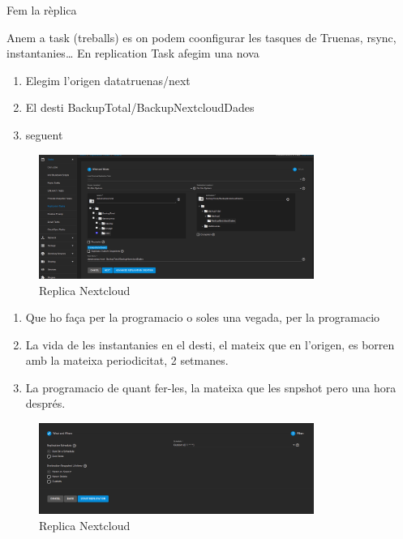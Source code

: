 \documentclass[
  10pt,
]{krantz}
\providecommand{\tightlist}{%
  \setlength{\itemsep}{0pt}\setlength{\parskip}{0pt}}
\begin{document}
Fem la rèplica

Anem a task (treballs) es on podem coonfigurar les tasques de Truenas, rsync, instantanies\ldots{} En replication Task afegim una nova

\begin{enumerate}
\def\labelenumi{\arabic{enumi}.}
\tightlist
\item
  Elegim l'origen datatruenas/next
\item
  El desti BackupTotal/BackupNextcloudDades
\item
  seguent
\end{enumerate}

\begin{figure}
\centering
\includegraphics[width=0.8\textwidth,height=\textheight]{imatges/proxmox/replica1.png}
\caption{Replica Nextcloud}
\end{figure}

\begin{enumerate}
\def\labelenumi{\arabic{enumi}.}
\tightlist
\item
  Que ho faça per la programacio o soles una vegada, per la programacio
\item
  La vida de les instantanies en el desti, el mateix que en l'origen, es borren amb la mateixa periodicitat, 2 setmanes.
\item
  La programacio de quant fer-les, la mateixa que les snpshot pero una hora després.
\end{enumerate}

\begin{figure}
\centering
\includegraphics[width=0.8\textwidth,height=\textheight]{imatges/proxmox/replica2.png}
\caption{Replica Nextcloud}
\end{figure}
\end{document}
